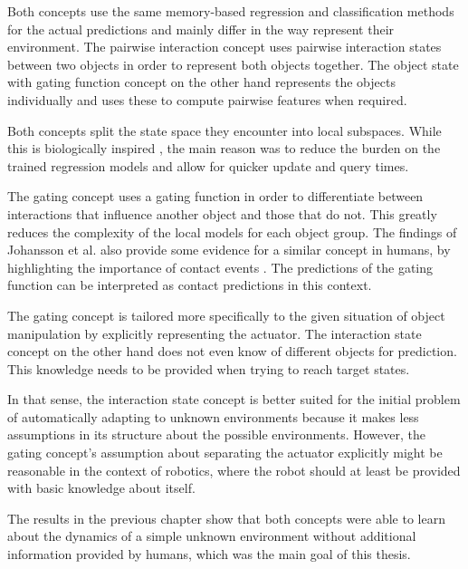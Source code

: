 Both concepts use the same memory-based regression and classification methods for the actual predictions and mainly differ in the way represent their environment. The pairwise interaction concept uses pairwise interaction states between two objects in order to represent both objects together. The object state with gating function concept on the other hand represents the objects individually and uses these to compute pairwise features when required.

Both concepts split the state space they encounter into local subspaces. While this is biologically inspired \cite{kawato1999internal}, the main reason was to reduce the burden on the trained regression models and allow for quicker update and query times.

The gating concept uses a gating function in order to differentiate between interactions that influence another object and those that do not. This greatly reduces the complexity of the local models for each object group. The findings of Johansson et al. also provide some evidence for a similar concept in humans, by highlighting the importance of contact events \cite{johansson2001eye}. The predictions of the gating function can be interpreted as contact predictions in this context.

The gating concept is tailored more specifically to the given situation of object manipulation by explicitly representing the actuator. The interaction state concept on the other hand does not even know of different objects for prediction. This knowledge needs to be provided when trying to reach target states.

In that sense, the interaction state concept is better suited for the initial problem of automatically adapting to unknown environments because it makes less assumptions in its structure about the possible environments. 
However, the gating concept's assumption about separating the actuator explicitly might be reasonable in the context of robotics, where the robot should at least be provided with basic knowledge about itself. 

The results in the previous chapter show that both concepts were able to learn about the dynamics of a simple unknown environment without additional information provided by humans, which was the main goal of this thesis.

